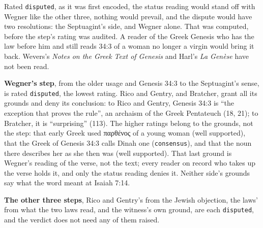 \documentclass[11pt]{article}
\begin{document}
Rated \texttt{disputed}, as it was first encoded, the status reading would stand off with Wegner like the other three, nothing would prevail, and the dispute would have two resolutions: the Septuagint’s side, and Wegner alone. That was computed, before the step’s rating was audited. A reader of the Greek Genesis who has the law before him and still reads 34:3 of a woman no longer a virgin would bring it back. Wevers’s \emph{Notes on the Greek Text of Genesis} and Harl’s \emph{La Genèse} have not been read.

\textbf{Wegner’s step}, from the older usage and Genesis 34:3 to the Septuagint’s sense, is rated \texttt{disputed}, the lowest rating. Rico and Gentry, and Bratcher, grant all its grounds and deny its conclusion: to Rico and Gentry, Genesis 34:3 is “the exception that proves the rule”, an archaism of the Greek Pentateuch (18, 21); to Bratcher, it is “surprising” (113). The higher ratings belong to the grounds, not the step: that early Greek used παρθένος of a young woman (well supported), that the Greek of Genesis 34:3 calls Dinah one (\texttt{consensus}), and that the noun there describes her as she then was (well supported). That last ground is Wegner’s reading of the verse, not the text; every reader on record who takes up the verse holds it, and only the status reading denies it. Neither side’s grounds say what the word meant at Isaiah 7:14.

\textbf{The other three steps}, Rico and Gentry’s from the Jewish objection, the laws’ from what the two laws read, and the witness’s own ground, are each \texttt{disputed}, and the verdict does not need any of them raised.
\end{document}
